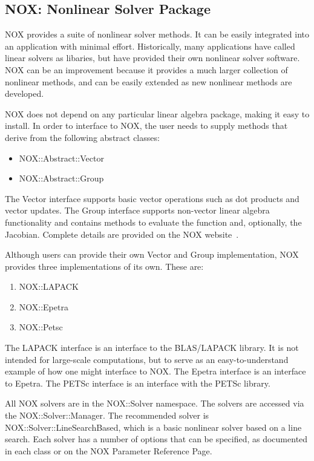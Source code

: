 \documentclass[12pt,relax]{SANDreport}
\begin{document}
\subsection{NOX: Nonlinear Solver Package}

NOX provides a suite of nonlinear solver methods.  It can be easily integrated
into an application with minimal effort.  Historically, many applications have called
linear solvers as libaries, but have provided their own nonlinear solver software.  NOX
can be an improvement because it provides a much larger collection of nonlinear methods,
and can be easily extended as new nonlinear methods are developed.  

NOX does not depend on any particular linear algebra package, making it easy to install. In
order to interface to NOX, the user needs to supply methods that derive from the following abstract classes: 
\begin{itemize}
\item NOX::Abstract::Vector
\item NOX::Abstract::Group
\end{itemize}
The Vector interface supports basic vector operations such as dot products and vector updates. 
The Group interface supports non-vector linear algebra functionality and contains methods 
to evaluate the function and, optionally, the Jacobian.
Complete details are provided on the NOX website~\cite{NOX-home-page}.

Although users can provide their own Vector and Group implementation, NOX provides three implementations
of its own.  These are:
\begin{enumerate}
\item NOX::LAPACK
\item NOX::Epetra
\item NOX::Petsc
\end{enumerate}
The LAPACK interface is an interface to the BLAS/LAPACK library. It is not intended for large-scale
computations, but to serve as an easy-to-understand example of how one might interface to NOX. 
The Epetra interface is an interface to Epetra.
The PETSc interface is an interface with the PETSc library. 

All NOX solvers are in the NOX::Solver namespace. The solvers are accessed via the NOX::Solver::Manager. The
recommended solver is NOX::Solver::LineSearchBased, which is a basic nonlinear solver based on a line search.
Each solver has a number of options that can be specified, as documented in each class or on the NOX Parameter
Reference Page. 
\end{document}
